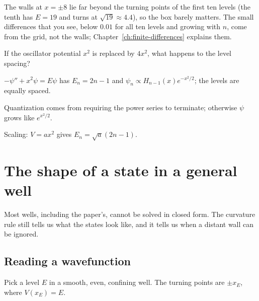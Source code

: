 The walls at $x=\pm8$ lie far beyond the turning points of the first ten levels (the tenth has $E=19$ and turns at $\sqrt{19}\approx4.4$), so the box barely matters. The small differences that you see, below $0.01$ for all ten levels and growing with $n$, come from the grid, not the walls; Chapter~\ref{ch:finite-differences} explains them.

\begin{checkpoint}
If the oscillator potential $x^2$ is replaced by $4x^2$, what happens to the level spacing?
\end{checkpoint}

\begin{keyideas}
\item $-\psi''+x^2\psi=E\psi$ has $E_n=2n-1$ and $\psi_n\propto H_{n-1}(x)e^{-x^2/2}$; the levels are equally spaced.
\item Quantization comes from requiring the power series to terminate; otherwise $\psi$ grows like $e^{x^2/2}$.
\item Scaling: $V=ax^2$ gives $E_n=\sqrt a(2n-1)$.
\end{keyideas}

\section{The shape of a state in a general well}\label{sec:bound-states-shape}

Most wells, including the paper's, cannot be solved in closed form. The curvature rule still tells us what the states look like, and it tells us when a distant wall can be ignored.

\subsection{Reading a wavefunction}

Pick a level $E$ in a smooth, even, confining well. The turning points are $\pm x_E$, where $V(x_E)=E$.

